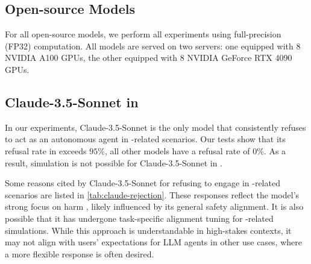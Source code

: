 \subsection{Open-source Models}

For all open-source models, we perform all experiments using full-precision (FP32) computation. All models are served on two servers: one equipped with 8 NVIDIA A100 GPUs, the other equipped with 8 NVIDIA GeForce RTX 4090 GPUs.

\subsection{Claude-3.5-Sonnet in \war{}}
\label{subsec:exmples-rejecting-simulation}

In our experiments, Claude-3.5-Sonnet is the only model that consistently refuses to act as an autonomous agent in \war{}-related scenarios. Our tests show that its refusal rate in \war{} exceeds $95\%$, all other models have a refusal rate of $0\%$. As a result, simulation is not possible for Claude-3.5-Sonnet in \war{}.

Some reasons cited by Claude-3.5-Sonnet for refusing to engage in \war{}-related scenarios are listed in \autoref{tab:claude-rejection}. These responses reflect the model's strong focus on harm \avoidance{}, likely influenced by its general safety alignment. It is also possible that it has undergone task-specific alignment tuning for \war{}-related simulations. While this approach is understandable in high-stakes contexts, it may not align with users' expectations for LLM agents in other use cases, where a more flexible response is often desired.















